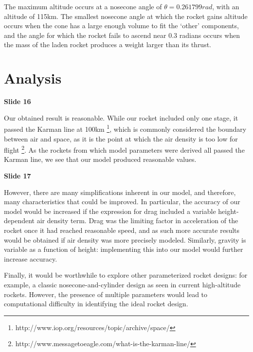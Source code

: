 \documentclass[]{article}
\begin{document}
The maximum altitude occurs at a nosecone angle of $\theta = 0.261799 rad$, with an altitude of 115km. The smallest nosecone angle at which the rocket gains altitude occurs when the cone has a large enough volume to fit the `other' components, and the angle for which the rocket fails to ascend near 0.3 radians occurs when the mass of the laden rocket produces a weight larger than its thrust.


\section{Analysis}
\textbf{Slide 16}

Our obtained result is reasonable. While our rocket included only one stage, it passed the Karman line at 100km \footnote{http://www.iop.org/resources/topic/archive/space/}, which is commonly considered the boundary between air and space, as it is the point at which the air density is too low for flight \footnote{http://www.messagetoeagle.com/what-is-the-karman-line/}. As the rockets from which model parameters were derived all passed the Karman line, we see that our model produced reasonable values.

\textbf{Slide 17}

However, there are many simplifications inherent in our model, and therefore, many characteristics that could be improved. In particular, the accuracy of our model would be increased if the expression for drag included a variable height-dependent air density term. Drag was the limiting factor in acceleration of the rocket once it had reached reasonable speed, and as such more accurate results would be obtained if air density was more precisely modeled. Similarly, gravity is variable as a function of height: implementing this into our model would further increase accuracy.

Finally, it would be worthwhile to explore other parameterized rocket designs: for example, a classic nosecone-and-cylinder design as seen in current high-altitude rockets. However, the presence of multiple parameters would lead to computational difficulty in identifying the ideal rocket design.
\end{document}
